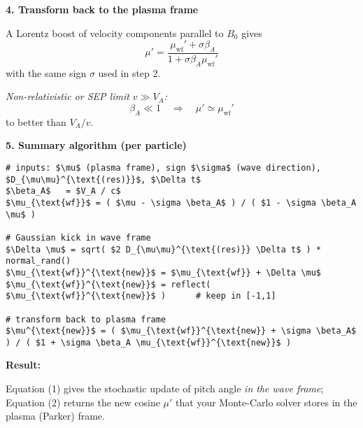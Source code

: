 \begin{tcolorbox}[colback=white, colframe=black, title={Pitch–Angle Cosine After a Single Monte-Carlo Scattering Step}]
\medskip

\textbf{4. Transform back to the plasma frame}

A Lorentz boost of velocity components parallel to $B_0$ gives
\begin{equation}
\boxed{
\mu' = \frac{\mu_{\text{wf}}' + \sigma \beta_A}{1 + \sigma \beta_A \mu_{\text{wf}}'}
}
\tag{2}
\end{equation}
with the same sign $\sigma$ used in step 2.

\medskip

\textit{Non-relativistic or SEP limit $v \gg V_A$:}
\[
\beta_A \ll 1 \quad \Rightarrow \quad \mu' \simeq \mu_{\text{wf}}'
\]
to better than $V_A / v$.

\medskip

\end{tcolorbox}
\begin{tcolorbox}[colback=white, colframe=black, title={Pitch–Angle Cosine After a Single Monte-Carlo Scattering Step}]

\textbf{5. Summary algorithm (per particle)}
\begin{lstlisting}[mathescape=true, basicstyle=\ttfamily\small]
# inputs: $\mu$ (plasma frame), sign $\sigma$ (wave direction), $D_{\mu\mu}^{\text{(res)}}$, $\Delta t$
$\beta_A$   = $V_A / c$
$\mu_{\text{wf}}$ = ( $\mu - \sigma \beta_A$ ) / ( $1 - \sigma \beta_A \mu$ )

# Gaussian kick in wave frame
$\Delta \mu$ = sqrt( $2 D_{\mu\mu}^{\text{(res)}} \Delta t$ ) * normal_rand()
$\mu_{\text{wf}}^{\text{new}}$ = $\mu_{\text{wf}} + \Delta \mu$
$\mu_{\text{wf}}^{\text{new}}$ = reflect( $\mu_{\text{wf}}^{\text{new}}$ )      # keep in [-1,1]

# transform back to plasma frame
$\mu^{\text{new}}$ = ( $\mu_{\text{wf}}^{\text{new}} + \sigma \beta_A$ ) / ( $1 + \sigma \beta_A \mu_{\text{wf}}^{\text{new}}$ )
\end{lstlisting}


\medskip

\textbf{Result:}

Equation (1) gives the stochastic update of pitch angle \emph{in the wave frame}; Equation (2) returns the new cosine $\mu'$ that your Monte-Carlo solver stores in the plasma (Parker) frame.

\end{tcolorbox}


